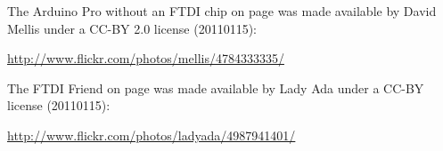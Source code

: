 The Arduino Pro without an FTDI chip on page \pageref{image:no-ftdi-arduino} was made available by David Mellis under a CC-BY 2.0 license (20110115):

\small{\url{http://www.flickr.com/photos/mellis/4784333335/}}

The FTDI Friend on page \pageref{image:ftdi-friend} was made available by Lady Ada under a  CC-BY license  (20110115):

\small{\url{http://www.flickr.com/photos/ladyada/4987941401/}}




\begin{comment}
	Juggling choices
	http://www.flickr.com/photos/teducation/2592566840/
	http://www.flickr.com/photos/sillylissy/2430488413/
	http://www.flickr.com/photos/helico/404640681/
	
	Waiting choices
	http://www.flickr.com/photos/myklroventine/3253953943/ (bus stop)
	http://www.flickr.com/photos/25182350@N03/2957915812/ (lady)
\end{comment}